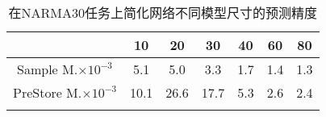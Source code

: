 \begin{center}
\begin{table}
	\caption{在NARMA30任务上简化网络不同模型尺寸的预测精度}
	\renewcommand\arraystretch{1.2}
	\setlength{\tabcolsep}{12pt}
	\begin{tabular}{ccccccc}
	\toprule
		 							&	10		&	20		&	30		&	40		&	60		&	80		\\	\midrule
	Sample M.\(\times 10^{-3}\)		&	5.1		&	5.0		&	3.3		&	1.7		&	1.4		&	1.3	 \\	\hline
	PreStore M.\(\times 10^{-3}\)	&	10.1	&	26.6		&	17.7		&	5.3		&	2.6		&	2.4	\\	
	\bottomrule
	\label{tab:narma30}
	\end{tabular}
\end{table}
\vspace{-4em}
\end{center}

